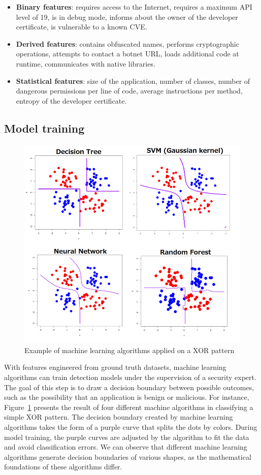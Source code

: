 \begin{itemize}
  \item \textbf{Binary features}: requires access to the Internet, requires a maximum API level of 19, is in debug mode, informs about the owner of the developer certificate, is vulnerable to a known CVE.
  \item \textbf{Derived features}: contains obfuscated names, performs cryptographic operations, attempts to contact a botnet URL, loads additional code at runtime, communicates with native libraries.
  \item \textbf{Statistical features}: size of the application, number of classes, number of dangerous permissions per line of code, average instructions per method, entropy of the developer certificate.
\end{itemize}

\subsection{Model training}

\begin{figure}[!ht]
        \centering
	\includegraphics[width=0.75\linewidth]{figures/background/decision.png}
        \caption[Results of machine learning algorithms applied on a XOR pattern]{Example of machine learning algorithms applied on a XOR pattern~\cite{ozaki_decision_2015}}
	\label{figure:background:decision}
\end{figure}

With features engineered from ground truth datasets, machine learning algorithms can train detection models under the supervision of a security expert.
The goal of this step is to draw a decision boundary between possible outcomes, such as the possibility that an application is benign or malicious.
For instance, Figure~\ref{figure:background:decision} presents the result of four different machine algorithms in classifying a simple XOR pattern.
The decision boundary created by machine learning algorithms takes the form of a purple curve that splits the dots by colors.
During model training, the purple curves are adjusted by the algorithm to fit the data and avoid classification errors.
We can observe that different machine learning algorithms generate decision boundaries of various shapes, as the mathematical foundations of these algorithms differ.

